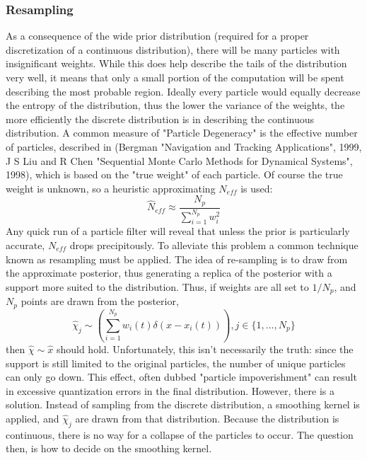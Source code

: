 \documentclass{article}
\begin{document}
\subsubsection{Resampling}
As a consequence 
of the wide prior distribution (required for a proper discretization of a continuous
distribution), there will be many particles with insignificant weights. While this does help
describe the tails of the distribution very well, it means that only a small portion of the
computation will be spent describing the most probable region. Ideally every particle would 
equally decrease the entropy of the distribution, thus the lower the variance of the weights,
the more efficiently the discrete distribution is in describing the continuous distribution. 
A common measure of "Particle Degeneracy" is the effective number of particles, described
in (Bergman "Navigation and Tracking Applications", 1999, J S Liu and R Chen "Sequential 
Monte Carlo Methods for Dynamical Systems", 1998), which is based on the "true weight"
of each particle. Of course the true weight is unknown, so a heuristic approximating 
$N_{eff}$ is used:
\begin{equation}
\label{neff}
\hat{N}_{eff} \approx \frac{N_p}{\sum_{i=1}^{N_p} w_i^2}
\end{equation}
Any quick run of a particle filter will reveal that unless the prior is particularly accurate,
$N_{eff}$ drops precipitously.  To alleviate this problem
a common technique known as resampling must be applied. The idea of re-sampling is to 
draw from the approximate posterior, thus generating a replica of the posterior with 
a support more suited to the distribution. Thus, if weights are all set to $1/N_p$, and 
$N_p$ points are drawn from the posterior,
\begin{equation}
\hat{\chi}_j \sim \left(\sum_{i=1}^{N_p} w_i(t)\delta(x - x_i(t))\right), j \in \{1, ..., N_p\}
\end{equation}
then $\hat{\chi} \sim \hat{x}$ should hold. Unfortunately, this isn't necessarily the truth: since the support is
still limited to the original particles, the number of unique particles can only go down.
This effect, often dubbed "particle impoverishment" can result in excessive quantization
errors in the final distribution. However, there is a solution. Instead of sampling from the
discrete distribution, a smoothing kernel is applied, and $\hat{\chi}_j$ are drawn from
that distribution. Because the distribution is continuous, there is no way for a collapse
of the particles to occur. The question then, is how to decide on the smoothing kernel. 
\end{document}
